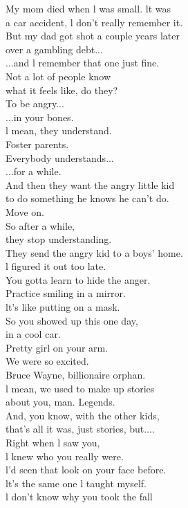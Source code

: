\documentclass{article}
\begin{document}
\begin{multicols}{3}
My mom died when l was small. lt was\\
a car accident, l don't really remember it.\\
But my dad got shot a couple years later\\
over a gambling debt...\\
...and l remember that one just fine.\\
Not a lot of people know\\
what it feels like, do they?\\
To be angry...\\
...in your bones.\\
l mean, they understand.\\
Foster parents.\\
Everybody understands...\\
...for a while.\\
And then they want the angry little kid\\
to do something he knows he can't do.\\
Move on.\\
So after a while,\\
they stop understanding.\\
They send the angry kid to a boys' home.\\
l figured it out too late.\\
You gotta learn to hide the anger.\\
Practice smiling in a mirror.\\
lt's like putting on a mask.\\
So you showed up this one day,\\
in a cool car.\\
Pretty girl on your arm.\\
We were so excited.\\
Bruce Wayne, billionaire orphan.\\
l mean, we used to make up stories\\
about you, man. Legends.\\
And, you know, with the other kids,\\
that's all it was, just stories, but....\\
Right when l saw you,\\
l knew who you really were.\\
l'd seen that look on your face before.\\
lt's the same one l taught myself.\\
l don't know why you took the fall\\

\end{multicols}
\end{document}
